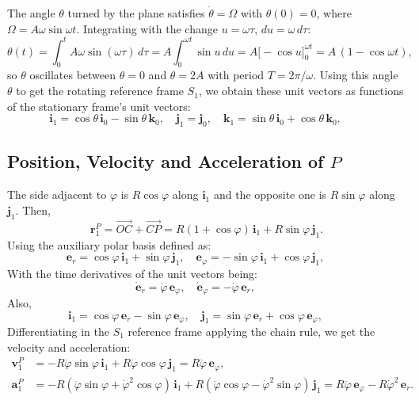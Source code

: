 \documentclass[11pt,a4paper]{article}
\numberwithin{equation}{section}
\newcommand{\er}{\mathbf{e}_r}
\newcommand{\ephi}{\mathbf{e}_\varphi}
\newcommand{\ii}{\mathbf{i}_1}
\newcommand{\jj}{\mathbf{j}_1}
\newcommand{\kk}{\mathbf{k}_1}
\newcommand{\rr}{\mathbf{r}_1^P}
\newcommand{\dph}{\dot\varphi}
\newcommand{\ddph}{\ddot\varphi}
\begin{document}
The angle $\theta$ turned by the plane satisfies $\dot\theta=\Omega$ with $\theta(0)=0$, where $\Omega=A\omega\sin\omega t$. Integrating with the change $u=\omega\tau$, $du=\omega\,d\tau$:
\begin{equation}
\theta(t)=\int_0^t A\omega\sin(\omega\tau)\,d\tau=A\int_0^{\omega t}\sin u\,du=A\big[-\cos u\big]_0^{\omega t}=A\,(1-\cos\omega t),\label{eq:theta}
\end{equation}
so $\theta$ oscillates between $\theta=0$ and $\theta=2A$ with period $T=2\pi/\omega$. Using this angle $\theta$ to get the rotating reference frame $S_1$, we obtain these unit vectors as functions of the stationary frame's unit vectors:
\begin{equation}
\ii=\cos\theta\,\mathbf{i}_0-\sin\theta\,\mathbf{k}_0,\quad \jj=\mathbf{j}_0,\quad \kk=\sin\theta\,\mathbf{i}_0+\cos\theta\,\mathbf{k}_0,\qquad
\end{equation}


\subsection{Position, Velocity and Acceleration of $P$}
The side adjacent to $\varphi$ is $R\cos\varphi$ along $\ii$ and the opposite one is $R\sin\varphi$ along $\jj$. Then,~\cite{notes}
\begin{equation}
\rr=\overrightarrow{OC}+\overrightarrow{CP}=R(1+\cos\varphi)\,\ii+R\sin\varphi\,\jj .\label{eq:r}
\end{equation}
Using the auxiliary polar basis defined as:
\begin{equation}
\er = \cos\varphi\,\ii + \sin\varphi\,\jj,\quad \ephi = -\sin\varphi\,\ii + \cos\varphi\,\jj,\qquad
\end{equation}
With the time derivatives of the unit vectors being:
\begin{equation}
\dot{\mathbf{e}}_r = \dph\,\ephi,\quad \dot{\mathbf{e}}_\varphi = -\dph\,\er,\qquad
\end{equation}
Also,
\begin{equation}
\ii = \cos\varphi\,\er - \sin\varphi\,\ephi,\quad \jj = \sin\varphi\,\er + \cos\varphi\,\ephi,\qquad
\end{equation}
Differentiating in the $S_1$ reference frame applying the chain rule, we get the velocity and acceleration:
\begin{align}
\mathbf{v}_1^P&=-R\dph\sin\varphi\,\ii+R\dph\cos\varphi\,\jj=R\dph\,\ephi,\label{eq:vrel}\\
\mathbf{a}_1^P&=-R(\ddph\sin\varphi+\dph^2\cos\varphi)\,\ii+R(\ddph\cos\varphi-\dph^2\sin\varphi)\,\jj=R\ddph\,\ephi-R\dph^2\,\er .\label{eq:arel}
\end{align}
\end{document}
